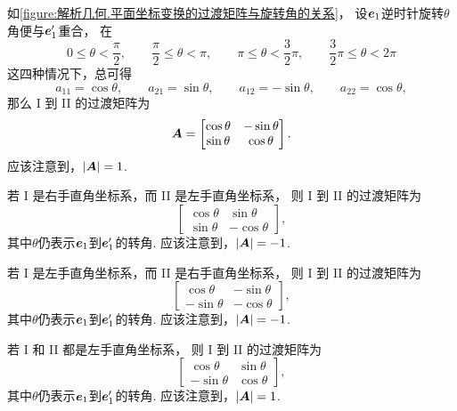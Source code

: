 如\cref{figure:解析几何.平面坐标变换的过渡矩阵与旋转角的关系}，
设\(\boldsymbol{e}_1\)逆时针旋转\(\theta\)角便与\(\boldsymbol{e}_1'\)重合，
在\begin{equation*}
	0 \leq \theta < \frac{\pi}{2}, \qquad
	\frac{\pi}{2} \leq \theta < \pi, \qquad
	\pi \leq \theta < \frac{3}{2}\pi, \qquad
	\frac{3}{2}\pi \leq \theta < 2\pi
\end{equation*}这四种情况下，总可得\begin{equation*}
	a_{11} = \cos\theta, \qquad
	a_{21} = \sin\theta, \qquad
	a_{12} = -\sin\theta, \qquad
	a_{22} = \cos\theta,
\end{equation*}
那么 I 到 II 的过渡矩阵为\begin{equation*}
	\boldsymbol{A} = \begin{bmatrix}
		\cos\theta & -\sin\theta \\
		\sin\theta & \cos\theta
	\end{bmatrix}.
\end{equation*}
应该注意到，\(\abs{\boldsymbol{A}}=1\).

若 I 是右手直角坐标系，而 II 是左手直角坐标系，
则 I 到 II 的过渡矩阵为\begin{equation*}
	\begin{bmatrix}
		\cos\theta & \sin\theta \\
		\sin\theta & -\cos\theta
	\end{bmatrix},
\end{equation*}
其中\(\theta\)仍表示\(\boldsymbol{e}_1\)到\(\boldsymbol{e}_1'\)的转角.
应该注意到，\(\abs{\boldsymbol{A}}=-1\).

若 I 是左手直角坐标系，而 II 是右手直角坐标系，
则 I 到 II 的过渡矩阵为\begin{equation*}
	\begin{bmatrix}
		\cos\theta & -\sin\theta \\
		-\sin\theta & -\cos\theta
	\end{bmatrix},
\end{equation*}
其中\(\theta\)仍表示\(\boldsymbol{e}_1\)到\(\boldsymbol{e}_1'\)的转角.
应该注意到，\(\abs{\boldsymbol{A}}=-1\).

若 I 和 II 都是左手直角坐标系，
则 I 到 II 的过渡矩阵为\begin{equation*}
	\begin{bmatrix}
		\cos\theta & \sin\theta \\
		-\sin\theta & \cos\theta
	\end{bmatrix},
\end{equation*}
其中\(\theta\)仍表示\(\boldsymbol{e}_1\)到\(\boldsymbol{e}_1'\)的转角.
应该注意到，\(\abs{\boldsymbol{A}}=1\).

